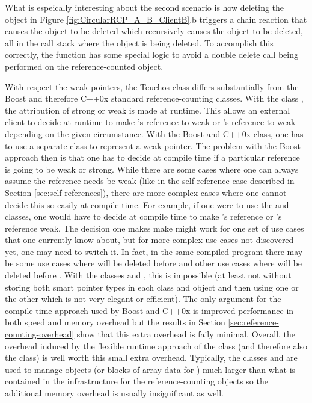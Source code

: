 \documentclass[pdf,ps2pdf,11pt]{SANDreport}
\begin{document}
What is espeically interesting about the second scenario is how
deleting the {} object in Figure
{}\ref{fig:CircularRCP_A_B_ClientB}.b triggers a chain reaction that
causes the {} object to be deleted which recursively causes
the {} object to be deleted, all in the call stack where
the {} object is being deleted.  To accomplish this
correctly, the {} function has some
special logic to avoid a double delete call being performed on the
reference-counted object.

With respect the weak pointers, the Teuchos class {} differs
substantially from the Boost and therefore C++0x standard
reference-counting classes.  With the class {}, the
attribution of strong or weak is made at runtime.  This allows an
external client to decide at runtime to make {}'s reference to
{} weak or {}'s reference to {} weak depending on
the given circumstance.  With the Boost and C++0x {}
class, one has to use a separate class {} to represent
a weak pointer.  The problem with the Boost approach then is that one
has to decide at compile time if a particular reference is going to be
weak or strong.  While there are some cases where one can always
assume the reference needs be weak (like in the self-reference case
described in Section {}\ref{sec:self-references}), there are more
complex cases where one cannot decide this so easily at compile time.
For example, if one were to use the {} and
{} classes, one would have to decide at compile time to
make {}'s reference or {}'s reference weak.  The
decision one makes make might work for one set of use cases that one
currently know about, but for more complex use cases not discovered
yet, one may need to switch it.  In fact, in the same compiled program
there may be some use cases where {} will be deleted before
{} and other use cases where {} will be deleted before
{}.  With the classes {} and
{}, this is impossible (at least not without storing
both smart pointer types in each class {} and {} object
and then using one or the other which is not very elegant or
efficient).  The only argument for the compile-time approach used by
Boost and C++0x is improved performance in both speed and memory
overhead but the results in Section
{}\ref{sec:reference-counting-overhead} show that this extra overhead
is faily minimal.  Overall, the overhead induced by the flexible
runtime approach of the {} class (and therefore also the
{} class) is well worth this small extra overhead.
Typically, the classes {} and {} are used to
manage objects (or blocks of array data for {}) much
larger than what is contained in the infrastructure for the
reference-counting objects so the additional memory overhead is
usually insignificant as well.
\end{document}
